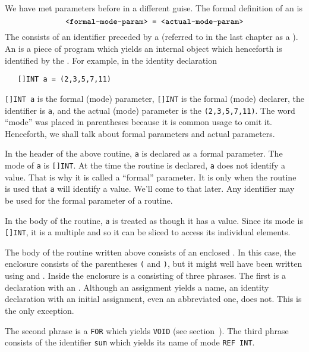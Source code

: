 We have met parameters before in a different guise. The formal
definition of an
is
$$\hbox{\texttt{<formal-mode-param> = <actual-mode-param>}}$$
The  consists of an
identifier preceded by a  (referred to in
the last chapter as a ). An
 is a piece of program which
yields an internal object which henceforth is identified by the
. For example, in the identity declaration
\begin{verbatim}
   []INT a = (2,3,5,7,11)
\end{verbatim}
\noindent
\verb|[]INT a| is the formal (mode) parameter, \verb|[]INT| is the
formal (mode) declarer, the identifier is \verb|a|, and the actual
(mode) parameter is the 
\verb|(2,3,5,7,11)|.  The word ``mode'' was placed in parentheses
because it is common usage to omit it.  Henceforth, we shall talk
about formal parameters and actual parameters.

In the header of the above routine, \verb|a| is declared as a formal
parameter.  The mode of \verb|a| is \verb|[]INT|.  At the time the
routine is declared, \verb|a| does not identify a value.  That is why
it is called a ``formal'' parameter.  It is only when the routine is
used that \verb|a| will identify a value.  We'll come to that later.
Any identifier may be used for the formal parameter of a routine.

In the body of the routine, \verb|a| is treated as though it has a
value. Since its mode is \verb|[]INT|, it is a multiple and so it
can be sliced to access its individual elements.

The body of the routine written above consists of an enclosed
. In this case, the enclosure consists
of the parentheses \verb|(| and \verb|)|, but it might well have been
written using  and . Inside the enclosure is a
 consisting of three phrases. The
first is a declaration with an .  Although an
assignment yields a name, an identity declaration with an initial
assignment, even an abbreviated one, does not.  This is the only
exception.

The second phrase is a \verb|FOR| 
which yields \verb|VOID| (see section~).  The third
phrase consists of the identifier \verb|sum| which yields its name
of mode \verb|REF INT|.

